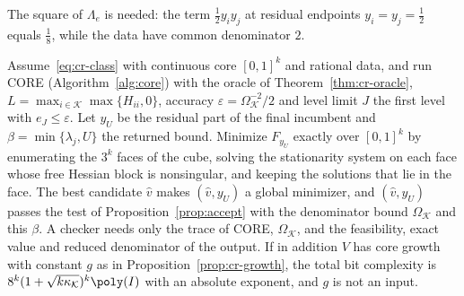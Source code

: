 The square of $\Lambda_e$ is needed: the term $\frac12y_iy_j$ at residual
endpoints $y_i=y_j=\frac12$ equals $\frac18$, while the data have common
denominator $2$.

\begin{theorem}\label{thm:cr-exact}
Assume~\eqref{eq:cr-class} with continuous core $[0,1]^k$ and rational data,
and run CORE (Algorithm~\ref{alg:core}) with the oracle of
Theorem~\ref{thm:cr-oracle}, $L=\max_{i\in\mathcal K}\max\{H_{ii},0\}$,
accuracy $\varepsilon=\Omega_{\mathcal K}^{-2}/2$ and level limit $J$ the
first level with $e_J\le\varepsilon$. Let $y_U$ be the residual part of the
final incumbent and $\beta=\min\{\lambda_j,U\}$ the returned bound.
Minimize $F_{y_U}$ exactly over $[0,1]^k$ by enumerating the $3^k$ faces of
the cube, solving the stationarity system on each face whose free Hessian
block is nonsingular, and keeping the solutions that lie in the face. The best candidate $\hat v$ makes $(\hat v,y_U)$ a global
minimizer, and $(\hat v,y_U)$ passes the test of
Proposition~\ref{prop:accept} with the denominator bound
$\Omega_{\mathcal K}$ and this $\beta$. A checker needs only
the trace of CORE, $\Omega_{\mathcal K}$, and the feasibility, exact value
and reduced denominator of the output. If in addition $V$ has core growth
with constant $g$ as in Proposition~\ref{prop:cr-growth}, the total bit
complexity is $8^k(1+\sqrt{k\kappa_{\mathcal K}})^k\poly(I)$ with an
absolute exponent, and $g$ is not an input.
\end{theorem}

